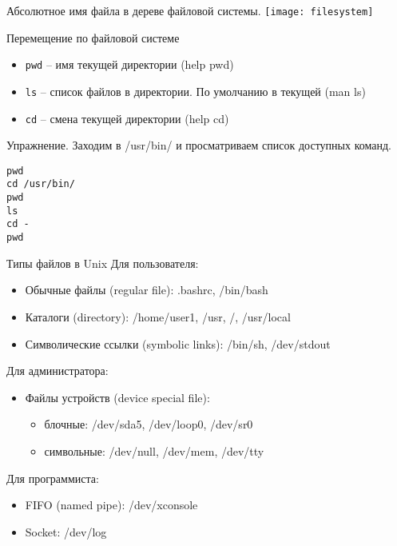 \begin{frame}{Абсолютное имя файла в дереве файловой системы.}
\texttt{[image: filesystem]} 
\end{frame}

\begin{frame}[fragile]{Перемещение по файловой системе}
      \begin{itemize}
		  \item {\tt pwd} -- имя текущей директории (help pwd)
		  \item {\tt ls} -- список файлов в директории. По умолчанию в текущей (man ls)
		  \item {\tt cd} -- смена текущей директории (help cd)
      \end{itemize}
      \begin{block}{Упражнение. Заходим в /usr/bin/ и просматриваем список доступных команд.}
\begin{lstlisting}
pwd
cd /usr/bin/
pwd
ls
cd -
pwd
\end{lstlisting}
      \end{block}
\end{frame}


%
%
%
%
%
%

\begin{frame}{Типы файлов в Unix}
  Для пользователя:
  \begin{itemize}
    \item \alert{Обычные файлы (regular file)}: .bashrc, /bin/bash
    \item \alert{Каталоги (directory)}: /home/user1, /usr, /, /usr/local  \pause
    \item \alert{Символические ссылки (symbolic links)}: /bin/sh, /dev/stdout
  \end{itemize} \pause
  Для администратора:
  \begin{itemize}
    \item \alert{Файлы устройств (device special file)}:
      \begin{itemize}
        \item \alert{блочные}: /dev/sda5, /dev/loop0, /dev/sr0
        \item \alert{символьные}: /dev/null, /dev/mem, /dev/tty
      \end{itemize}
  \end{itemize} \pause
  Для программиста:
  \begin{itemize}
    \item \alert{FIFO (named pipe)}: /dev/xconsole
    \item \alert{Socket}: /dev/log
  \end{itemize}

\end{frame}

